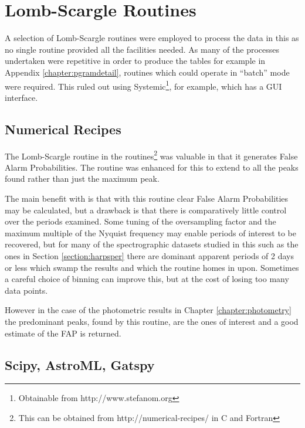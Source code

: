 \chapter{Lomb-Scargle Routines} %
\protect\label{chapter:lsroutines}

A selection of Lomb-Scargle routines were employed to process the data in this {\paperorthesis} as no single routine
provided all the facilities needed. As many of the processes undertaken were repetitive in order to produce the tables
for example in Appendix \ref{chapter:pgramdetail}, routines which could operate in ``batch'' mode were required. This
ruled out using Systemic\footnote{Obtainable from http://www.stefanom.org}, for example, which has a GUI interface.

\section{Numerical Recipes}

The Lomb-Scargle routine in the {\numrecs} routines\footnote{This can be obtained from http://numerical-recipes/
  in C and Fortran} was valuable in that it generates False Alarm Probabilities. The routine was enhanced for this
{\paperorthesis} to extend to all the peaks found rather than just the maximum peak.

The main benefit with {\numrecs} is that with this routine clear False Alarm Probabilities may be calculated, but a
drawback is that there is comparatively little control over the periods examined. Some tuning of the oversampling factor
and the maximum multiple of the Nyquist frequency may enable periods of interest to be recovered, but for many of the
spectrographic datasets studied in this {\paperorthesis} such as the {\harps} ones in Section \ref{section:harpsper}
there are dominant apparent periods of 2 days or less which swamp the results and which the routine homes in
upon. Sometimes a careful choice of binning can improve this, but at the cost of losing too many data points.

However in the case of the photometric results in Chapter \ref{chapter:photometry} the predominant peaks, found by this
routine, are the ones of interest and a good estimate of the FAP is returned.

\section{Scipy, AstroML, Gatspy}


